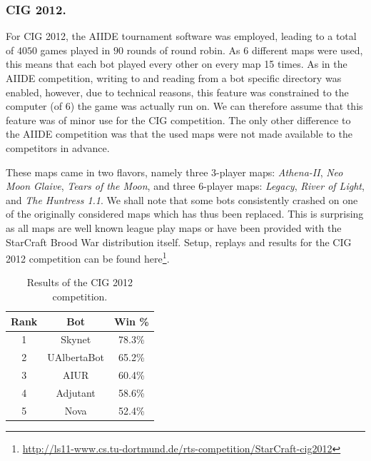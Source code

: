\documentclass{llncs}
\begin{document}
\subsubsection{CIG 2012.}

For CIG 2012, the AIIDE tournament software was employed,
leading to a total of $4050$ games played in $90$ rounds
of round robin. As 6 different maps were used, this means
that each bot played every other on every map 15 times. 
As in the AIIDE competition, writing to and reading from
a bot specific directory was enabled, however, due to 
technical reasons, this feature was constrained to the
computer (of 6) the game was actually run on. We can 
therefore assume that this feature was of minor use for
the CIG competition. The only other difference to the
AIIDE competition was that the used maps were not 
made available to the competitors in advance. 

These maps came in two flavors, namely three 3-player maps:
\emph{Athena-II}, \emph{Neo Moon Glaive}, \emph{Tears of the Moon},
and three 6-player maps:
\emph{Legacy}, \emph{River of Light}, and 
\emph{The Huntress 1.1}. 
We shall note that some bots consistently crashed on one
of the originally considered maps which has thus been replaced.
This is surprising as all maps are well known league play maps
or have been provided with the StarCraft Brood War distribution
itself.
Setup, replays and results for the CIG 2012 competition can be found
here\footnote{\url{http://ls11-www.cs.tu-dortmund.de/rts-competition/StarCraft-cig2012}}.

\begin{table}[t]
\caption{Results of the CIG 2012 competition.}
\label{tab:cig2012}
\centering
\begin{tabular}{|c|c|c|}
\hline
{\bfseries Rank} & {\bfseries Bot} & {\bfseries Win \%} \\
\hline
1 & Skynet & 78.3\% \\
2 & UAlbertaBot & 65.2\% \\
3 & AIUR & 60.4\% \\
4 & Adjutant & 58.6\% \\
5 & Nova & 52.4\% \\ 
\hline
\end{tabular}
\end{table}

\end{document}
